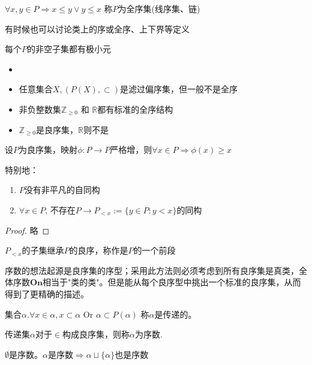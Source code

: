 \begin{Def}
    $\forall x,y \in P\Rightarrow x\leq y \vee y \leq x$ 称$P$为全序集(线序集、链)
\end{Def}

有时候也可以讨论类上的序或全序、上下界等定义
\begin{Def}
    每个$P$的非空子集都有极小元
\end{Def}

\begin{Exap} 
    \begin{itemize}
        \item \space
        \item 任意集合$X, (P(X),\subset)$是滤过偏序集，但一般不是全序
        \item 非负整数集$\mathbb{Z}_{\geq 0}$ 和 $\mathbb{R}$都有标准的全序结构
        \item $\mathbb{Z}_{\geq 0}$是良序集，$\mathbb{R}$则不是
    \end{itemize}
\end{Exap}

\begin{Lem}[良序集上的严格增算子必增]
    设$P$为良序集，映射$\phi :P\rightarrow P$严格增，则$\forall x \in P \Rightarrow \phi (x)\geq x$ 
    
    特别地：
    \begin{enumerate}
        \item $P$没有非平凡的自同构
        \item $\forall x\in P$, 不存在$P\rightarrow P_{<x}:=\{y\in P: y<x\}$的同构   
    \end{enumerate}
    \begin{proof}
        略
    \end{proof}
\end{Lem}

$P_{<x}$的子集继承$P$的良序，称作是$P$的一个前段

序数的想法起源是良序集的序型；采用此方法则必须考虑到所有良序集是真类，全体序数$\mathbf{On}$相当于"类的类"。但是能从每个良序型中挑出一个标准的良序集，从而得到了更精确的描述。

\begin{Def}
    集合$\alpha. \forall x\in \alpha, x\subset \alpha $ Or $\alpha \subset P(\alpha)$ 称$\alpha $是传递的。

    传递集$\alpha$对于$\in$构成良序集，则称$\alpha $为序数.

    $\emptyset $是序数。$\alpha $是序数$\Rightarrow \alpha \sqcup \{\alpha \}$也是序数
\end{Def}

